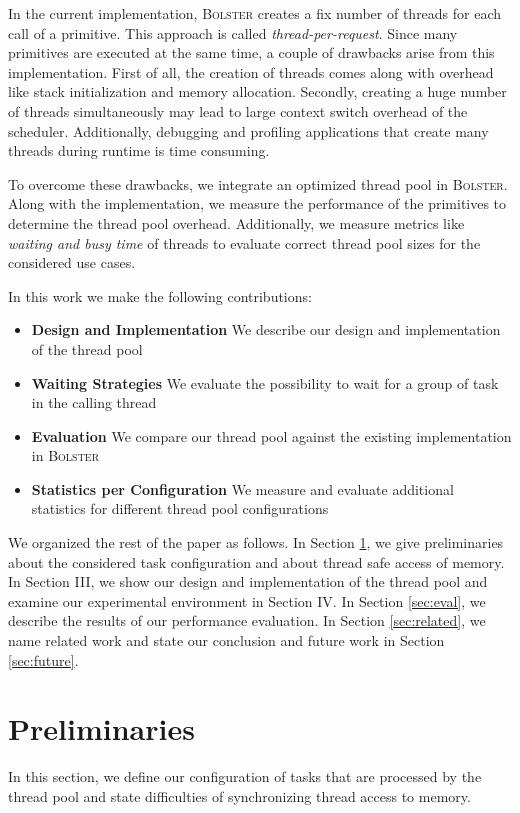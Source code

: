\documentclass[conference]{IEEEtran}
\begin{document}
In the current implementation, \textsc{Bolster} creates a fix number of threads for each call of a primitive. This approach is called \emph{thread-per-request}. Since many primitives are executed at the same time, a couple of drawbacks arise from this implementation.
First of all, the creation of threads comes along with overhead like stack initialization and memory allocation. Secondly, creating a huge number of threads simultaneously may lead to large context switch overhead of the scheduler. Additionally, debugging and profiling applications that create many threads during runtime is time consuming.

To overcome these drawbacks, we integrate an optimized thread pool in \textsc{Bolster}. Along with the implementation, we measure the performance of the primitives to determine the thread pool overhead. Additionally, we measure metrics like \emph{waiting and busy time} of threads to evaluate correct thread pool sizes for the considered use cases. 

In this work we make the following contributions:
\begin{itemize}
	\item \textbf{Design and Implementation} We describe our design and implementation of the thread pool
	\item \textbf{Waiting Strategies} We evaluate the possibility to wait for a group of task in the calling thread
	\item \textbf{Evaluation} We compare our thread pool against the existing implementation in \textsc{Bolster}
	\item \textbf{Statistics per Configuration} We measure and evaluate additional statistics for different thread pool configurations
\end{itemize}
We organized the rest of the paper as follows. In Section \ref{sec:pre}, we give preliminaries about the considered task configuration and about thread safe access of memory. In Section III, we show our design and implementation of the thread pool and examine our experimental environment in Section IV. In Section \ref{sec:eval}, we describe the results of our performance evaluation. In Section \ref{sec:related}, we name related work and state our conclusion and future work in Section \ref{sec:future}.

\section{Preliminaries}\label{sec:pre}
In this section, we define our configuration of tasks that are processed by the thread pool and state difficulties of synchronizing thread access to memory.
\end{document}
